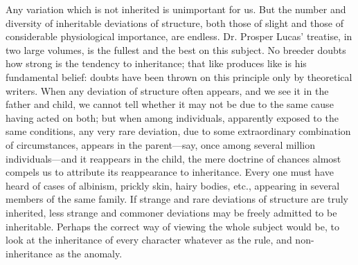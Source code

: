 Any variation which is not inherited is unimportant for us. But
the number and diversity of inheritable deviations of structure,
both those of slight and those of considerable physiological
importance, are endless. Dr. Prosper Lucas' treatise, in two large
volumes, is the fullest and the best on this subject. No breeder
doubts how strong is the tendency to inheritance; that like
produces like is his fundamental belief: doubts have been thrown on
this principle only by theoretical writers. When any deviation of
structure often appears, and we see it in the father and child, we
cannot tell whether it may not be due to the same cause having
acted on both; but when among individuals, apparently exposed to
the same conditions, any very rare deviation, due to some
extraordinary combination of circumstances, appears in the
parent—say, once among several million individuals—and it reappears
in the child, the mere doctrine of chances almost compels us to
attribute its reappearance to inheritance. Every one must have
heard of cases of albinism, prickly skin, hairy bodies, etc.,
appearing in several members of the same family. If strange and
rare deviations of structure are truly inherited, less strange and
commoner deviations may be freely admitted to be inheritable.
Perhaps the correct way of viewing the whole subject would be, to
look at the inheritance of every character whatever as the rule,
and non-inheritance as the anomaly.

